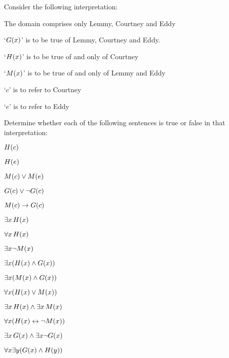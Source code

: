 \problempart
\label{pr.TorF2}
Consider the following interpretation:	
	\begin{ebullet}
		\item The domain comprises only Lemmy, Courtney and Eddy
		\item `$\mathord{G}(x)$' is to be true of Lemmy, Courtney and Eddy.
		\item `$\mathord{H}(x)$' is to be true of and only of Courtney
		\item `$\mathord{M}(x)$' is to be true of and only of Lemmy and Eddy
		\item `$c$' is to refer to Courtney
		\item `$e$' is to refer to Eddy
	\end{ebullet}
Determine whether each of the following sentences is true or false in that interpretation:
\begin{earg}
\item $\mathord{H}(c)$ \hfill {}
\item $\mathord{H}(e)$\hfill {}
\item $\mathord{M}(c) \vee \mathord{M}(e)$ \hfill {}
\item $\mathord{G}(c) \vee \neg \mathord{G}(c)$ \hfill {}
\item $\mathord{M}(c) \rightarrow \mathord{G}(c)$ \hfill {}
\item $\exists x\,\mathord{H}(x)$ \hfill {}
\item $\forall x\,\mathord{H}(x)$ \hfill {}
\item $\exists x \neg \mathord{M}(x)$ \hfill {}
\item $\exists x(\mathord{H}(x) \wedge \mathord{G}(x))$ \hfill {}
\item $\exists x(\mathord{M}(x) \wedge \mathord{G}(x))$ \hfill {}
\item $\forall x(\mathord{H}(x) \vee \mathord{M}(x))$ \hfill {}
\item $\exists x\,\mathord{H}(x) \wedge \exists x\,\mathord{M}(x)$ \hfill {}
\item $\forall x(\mathord{H}(x) \leftrightarrow \neg \mathord{M}(x))$ \hfill {}
\item $\exists x\,\mathord{G}(x) \wedge \exists x \neg \mathord{G}(x)$ \hfill {}
\item $\forall x\exists y(\mathord{G}(x) \wedge \mathord{H}(y))$ \hfill {}
\end{earg}

